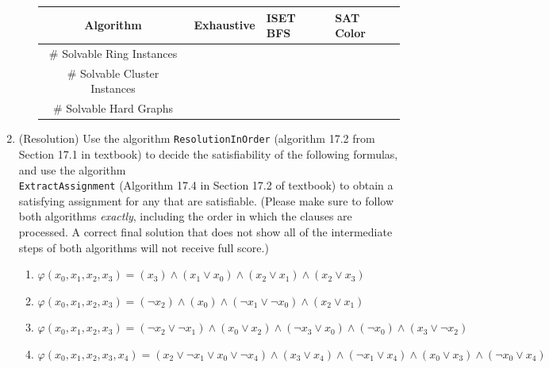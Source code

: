 \documentclass[11pt]{article}
\begin{document}
\begin{enumerate}
\begin{enumerate}
\begin{center}
    \begin{tabular}{|c|l|l|l|}
    \hline
    Algorithm
    & \multicolumn{1}{|p{2cm}|}{Exhaustive}
    & \multicolumn{1}{|p{2cm}|}{ISET BFS}
    & \multicolumn{1}{|p{2cm}|}{SAT Color}\\\hline
    \hline
        \# Solvable Ring Instances &  &  & \\
        \# Solvable Cluster Instances  &   & &  \\
        \# Solvable Hard Graphs  &   & &  \\
        \hline
    \end{tabular}
\end{center}
\end{enumerate}
\item (Resolution)
Use the algorithm \texttt{ResolutionInOrder} (algorithm 17.2 from Section 17.1 in textbook) to decide the satisfiability of the following formulas, and use the algorithm \\ \texttt{ExtractAssignment} (Algorithm 17.4 in Section 17.2 of textbook) to obtain a satisfying assignment for any that are satisfiable. (Please make sure to follow both algorithms \textit{exactly}, including the order in which the clauses are processed. A correct final solution that does not show all of the intermediate steps of both algorithms will not receive full score.)

\begin{enumerate}
 \item $\varphi(x_0, x_1, x_2, x_3) = (x_3) \wedge (x_1 \vee x_0)\wedge ( x_2 \vee  x_1)\wedge ( x_2 \vee  x_3)$\


  \item $\varphi(x_0, x_1, x_2, x_3) = (\neg x_2) \wedge ( x_0) \wedge (\neg x_1 \vee \neg x_0)\wedge ( x_2 \vee  x_1)$


 \item $\varphi(x_0, x_1, x_2, x_3) = (\neg x_2 \vee \neg x_1) \wedge (x_0 \vee x_2) \wedge (\neg x_3 \vee x_0) \wedge (\neg x_0) \wedge ( x_3 \vee \neg x_2)$

\item $\varphi(x_0, x_1, x_2, x_3, x_4) =  ( x_2 \vee  \neg x_1 \vee x_0\vee \neg x_4)\wedge ( x_3 \vee  x_4) \wedge ( \neg x_1 \vee  x_4)\wedge ( x_0 \vee  x_3)\wedge (\neg x_0 \vee  x_4)$


  \end{enumerate}


\end{enumerate}
\end{document}
